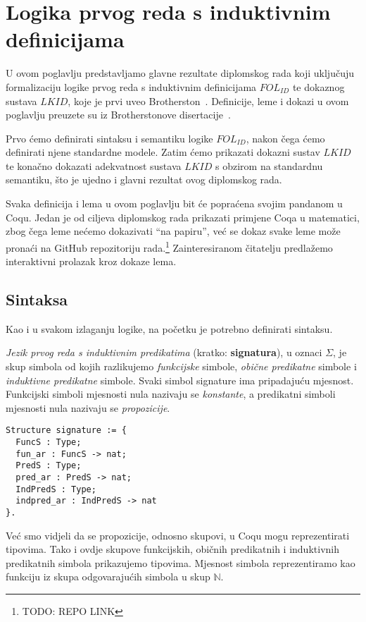 \chapter{Logika prvog reda s induktivnim definicijama}\label{cha:logika-prvog-reda}
U ovom poglavlju predstavljamo glavne rezultate diplomskog rada koji uključuju formalizaciju
logike prvog reda s induktivnim definicijama \(\mathit{FOL_{ID}}\)
te dokaznog sustava \(\mathit{LKID}\), koje je prvi uveo Brotherston~\cite{brotherston2005}.
Definicije, leme i dokazi u ovom poglavlju preuzete su iz Brotherstonove disertacije~\cite{brotherstonphd}.

Prvo ćemo definirati sintaksu i semantiku logike \(\mathit{FOL_{ID}}\),
nakon čega ćemo definirati njene standardne modele.
Zatim ćemo prikazati dokazni sustav \(\mathit{LKID}\) te konačno dokazati adekvatnost
sustava \(LKID\) s obzirom na standardnu semantiku,
što je ujedno i glavni rezultat ovog diplomskog rada.

Svaka definicija i lema u ovom poglavlju bit će popraćena svojim pandanom u Coqu.
Jedan je od ciljeva diplomskog rada prikazati primjene Coqa u matematici,
zbog čega leme nećemo dokazivati ``na papiru'',
već se dokaz svake leme može pronaći na GitHub repozitoriju rada.\footnote{TODO: REPO LINK}
Zainteresiranom čitatelju predlažemo interaktivni prolazak kroz dokaze lema.

\section{Sintaksa}\label{sec:sintaksa}
Kao i u svakom izlaganju logike, na početku je potrebno definirati sintaksu.
\begin{definition}\label{def:signatura}
  \textit{Jezik prvog reda s induktivnim predikatima} (kratko: \textbf{signatura}), u oznaci \(\Sigma\),
  je skup simbola od kojih razlikujemo \textit{funkcijske} simbole, \textit{obične predikatne} simbole
  i \textit{induktivne predikatne} simbole.
  Svaki simbol signature ima pripadajuću mjesnost.
  Funkcijski simboli mjesnosti nula nazivaju se \textit{konstante},
  a predikatni simboli mjesnosti nula nazivaju se \textit{propozicije}.
  \begin{verbatim}
Structure signature := {
  FuncS : Type;
  fun_ar : FuncS -> nat;
  PredS : Type;
  pred_ar : PredS -> nat;
  IndPredS : Type;
  indpred_ar : IndPredS -> nat
}.
  \end{verbatim}
\end{definition}

\noindent Već smo vidjeli da se propozicije, odnosno skupovi, u Coqu mogu reprezentirati tipovima.
Tako i ovdje skupove funkcijskih, običnih predikatnih i induktivnih predikatnih simbola prikazujemo tipovima.
Mjesnost simbola reprezentiramo kao funkciju iz skupa odgovarajućih simbola u skup \(\mathbb{N}\).

